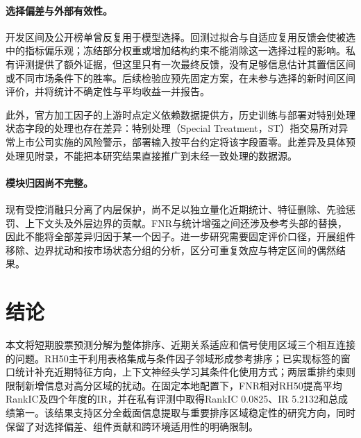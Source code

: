 \documentclass[UTF8,11pt,a4paper,fontset=fandol]{ctexart}
\begin{document}
\paragraph{选择偏差与外部有效性。}
开发区间及公开榜单曾反复用于模型选择。回测过拟合与自适应复用反馈会使被选中的指标偏乐观\cite{bailey2014,adaptive}；冻结部分权重或增加结构约束不能消除这一选择过程的影响。私有评测提供了额外证据，但这里只有一次最终反馈，没有足够信息估计其置信区间或不同市场条件下的胜率。后续检验应预先固定方案，在未参与选择的新时间区间评价，并将统计不确定性与平均收益一并报告。

此外，官方加工因子的上游时点定义依赖数据提供方，历史训练与部署对特别处理状态字段的处理也存在差异：特别处理（Special Treatment，ST）指交易所对异常上市公司实施的风险警示，部署输入按平台约定将该字段置零。此差异及具体预处理见附录，不能把本研究结果直接推广到未经一致处理的数据源。

\paragraph{模块归因尚不完整。}
现有受控消融只分离了内层保护，尚不足以独立量化近期统计、特征删除、先验惩罚、上下文头及外层边界的贡献。FNR与统计增强之间还涉及参考头部的替换，因此不能将全部差异归因于某一个因子。进一步研究需要固定评价口径，开展组件移除、边界扰动和按市场状态分组的分析，区分可重复效应与特定区间的偶然结果。

\section{结论}
本文将短期股票预测分解为整体排序、近期关系适应和信号使用区域三个相互连接的问题。RH50主干利用表格集成与条件因子邻域形成参考排序；已实现标签的窗口统计补充近期特征方向，上下文神经头学习其条件化使用方式；两层重排约束则限制新增信息对高分区域的扰动。在固定本地配置下，FNR相对RH50提高平均RankIC及四个年度的IR，并在私有评测中取得RankIC 0.0825、IR 5.2132和总成绩第一。该结果支持区分全截面信息提取与重要排序区域稳定性的研究方向，同时保留了对选择偏差、组件贡献和跨环境适用性的明确限制。
\end{document}
